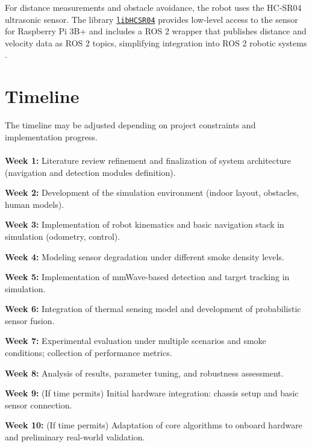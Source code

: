 \documentclass[conference]{IEEEtran}
\begin{document}
For distance measurements and obstacle avoidance, the robot uses the HC‑SR04 ultrasonic sensor. The library \href{https://github.com/mataruzz/libHCSR04}{\texttt{libHCSR04}} provides low-level access to the sensor for Raspberry Pi 3B+ and includes a ROS 2 wrapper that publishes distance and velocity data as ROS 2 topics, simplifying integration into ROS 2 robotic systems \cite{ultrasound_hcsr04}.

\section*{Timeline}
The timeline may be adjusted depending on project constraints and implementation progress.\\\\
\textbf{Week 1:} Literature review refinement and finalization of system architecture (navigation and detection modules definition). \

\textbf{Week 2:} Development of the simulation environment (indoor layout, obstacles, human models). \

\textbf{Week 3:} Implementation of robot kinematics and basic navigation stack in simulation (odometry, control). \

\textbf{Week 4:} Modeling sensor degradation under different smoke density levels. \

\textbf{Week 5:} Implementation of mmWave-based detection and target tracking in simulation. \

\textbf{Week 6:} Integration of thermal sensing model and development of probabilistic sensor fusion. \

\textbf{Week 7:} Experimental evaluation under multiple scenarios and smoke conditions; collection of performance metrics. \

\textbf{Week 8:} Analysis of results, parameter tuning, and robustness assessment. \

\textbf{Week 9:} (If time permits) Initial hardware integration: chassis setup and basic sensor connection. \

\textbf{Week 10:} (If time permits) Adaptation of core algorithms to onboard hardware and preliminary real-world validation. \
\end{document}
